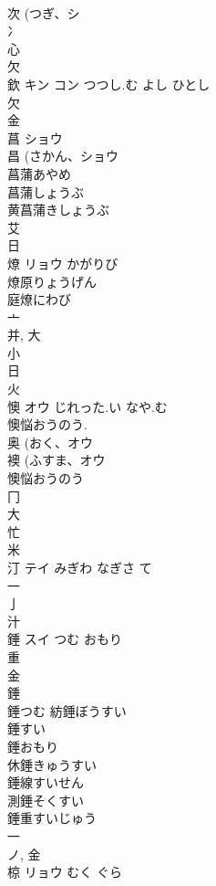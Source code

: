 \documentclass[8pt]{extreport}
\begin{document}
\begin{CJK}{UTF8}{min}
\\	次 (つぎ、シ 
\\	冫 
\\	心 
\\	欠 
\\	欽	キン コン	つつし.む よし ひとし	
\\	欠 
\\	金 
\\	菖	ショウ		
\\	昌 (さかん、ショウ 
\\	菖蒲あやめ 
\\	菖蒲しょうぶ 
\\	黄菖蒲きしょうぶ 
\\	艾 
\\	日 
\\	燎	リョウ	かがりび	
\\	燎原りょうげん 
\\	庭燎にわび 
\\	亠 
\\	并, 大 
\\	小 
\\	日 
\\	火 
\\	懊	オウ	じれった.い なや.む	
\\	懊悩おうのう. 
\\	奥 (おく、オウ 
\\	襖 (ふすま、オウ 
\\	懊悩おうのう
\\	冂 
\\	大 
\\	忙 
\\	米 
\\	汀	テイ	みぎわ なぎさ て	
\\	一 
\\	亅 
\\	汁 
\\	錘	スイ	つむ おもり	
\\	重 
\\	金 
\\	錘 
\\	錘つむ 紡錘ぼうすい 
\\	錘すい 
\\	錘おもり 
\\	休錘きゅうすい 
\\	錘線すいせん 
\\	測錘そくすい 
\\	錘重すいじゅう 
\\	一 
\\	ノ, 金 
\\	椋	リョウ	むく ぐら	

\end{CJK}
\end{document}
